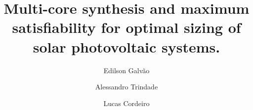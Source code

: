 \documentclass[review]{elsarticle}
\begin{document}

\title {Multi-core synthesis and maximum satisfiability for optimal sizing of solar photovoltaic systems.}                      



\author[mymainaddress]{Edilson Galvão}

\author[mymainaddress]{Alessandro Trindade}

\author[mysecondaryaddress]{Lucas Cordeiro}

%
\address[mymainaddress]{Federal University of Amazonas, Av. Rodrigo Octávio, 6200, 69077-000 Manaus-AM-Brazil}
\address[mysecondaryaddress]{University of Manchester, Kilburn Building, Manchester M13 9PL}
%
%
%


%
\end{document}
